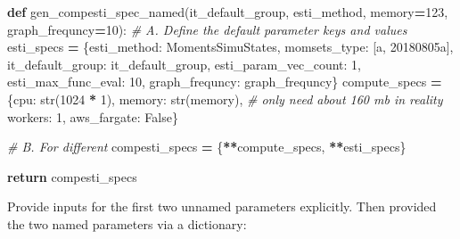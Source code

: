 \documentclass[
]{book}
\newenvironment{Shaded}{\begin{snugshade}}{\end{snugshade}}
\newcommand{\BuiltInTok}[1]{#1}
\newcommand{\CommentTok}[1]{\textcolor[rgb]{0.56,0.35,0.01}{\textit{#1}}}
\newcommand{\ControlFlowTok}[1]{\textcolor[rgb]{0.13,0.29,0.53}{\textbf{#1}}}
\newcommand{\DecValTok}[1]{\textcolor[rgb]{0.00,0.00,0.81}{#1}}
\newcommand{\KeywordTok}[1]{\textcolor[rgb]{0.13,0.29,0.53}{\textbf{#1}}}
\newcommand{\NormalTok}[1]{#1}
\newcommand{\OperatorTok}[1]{\textcolor[rgb]{0.81,0.36,0.00}{\textbf{#1}}}
\newcommand{\StringTok}[1]{\textcolor[rgb]{0.31,0.60,0.02}{#1}}
\newcommand{\VariableTok}[1]{\textcolor[rgb]{0.00,0.00,0.00}{#1}}
\begin{document}
\begin{Shaded}
\begin{Highlighting}[]
\KeywordTok{def}\NormalTok{ gen\_compesti\_spec\_named(it\_default\_group, esti\_method, memory}\OperatorTok{=}\DecValTok{123}\NormalTok{, graph\_frequncy}\OperatorTok{=}\DecValTok{10}\NormalTok{):}
    \CommentTok{\# A. Define the default parameter keys and values}
\NormalTok{    esti\_specs }\OperatorTok{=}\NormalTok{ \{}\StringTok{\textquotesingle{}esti\_method\textquotesingle{}}\NormalTok{: }\StringTok{\textquotesingle{}MomentsSimuStates\textquotesingle{}}\NormalTok{,}
                  \StringTok{\textquotesingle{}momsets\_type\textquotesingle{}}\NormalTok{: [}\StringTok{\textquotesingle{}a\textquotesingle{}}\NormalTok{, }\StringTok{\textquotesingle{}20180805a\textquotesingle{}}\NormalTok{],}
                  \StringTok{\textquotesingle{}it\_default\_group\textquotesingle{}}\NormalTok{: it\_default\_group,}
                  \StringTok{\textquotesingle{}esti\_param\_vec\_count\textquotesingle{}}\NormalTok{: }\DecValTok{1}\NormalTok{,}
                  \StringTok{\textquotesingle{}esti\_max\_func\_eval\textquotesingle{}}\NormalTok{: }\DecValTok{10}\NormalTok{,}
                  \StringTok{\textquotesingle{}graph\_frequncy\textquotesingle{}}\NormalTok{: graph\_frequncy\}}
\NormalTok{    compute\_specs }\OperatorTok{=}\NormalTok{ \{}\StringTok{\textquotesingle{}cpu\textquotesingle{}}\NormalTok{: }\BuiltInTok{str}\NormalTok{(}\DecValTok{1024} \OperatorTok{*} \DecValTok{1}\NormalTok{),}
                     \StringTok{\textquotesingle{}memory\textquotesingle{}}\NormalTok{: }\BuiltInTok{str}\NormalTok{(memory),  }\CommentTok{\# only need about 160 mb in reality}
                     \StringTok{\textquotesingle{}workers\textquotesingle{}}\NormalTok{: }\DecValTok{1}\NormalTok{,}
                     \StringTok{\textquotesingle{}aws\_fargate\textquotesingle{}}\NormalTok{: }\VariableTok{False}\NormalTok{\}}

    \CommentTok{\# B. For different}
\NormalTok{    compesti\_specs }\OperatorTok{=}\NormalTok{ \{}\OperatorTok{**}\NormalTok{compute\_specs, }\OperatorTok{**}\NormalTok{esti\_specs\}}

    \ControlFlowTok{return}\NormalTok{ compesti\_specs}
\end{Highlighting}
\end{Shaded}

Provide inputs for the first two unnamed parameters explicitly. Then provided the two named parameters via a dictionary:
\end{document}
